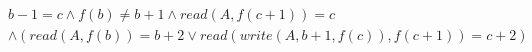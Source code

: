 \begin{align*}
%
& %
b - 1 = c
%
\land
%
f(b)  \neq  b + 1
%
\land
%
\mathit{read}(A,f(c + 1)) = c
~\\~
& %
%
\land
%
(\mathit{read}(A,f(b)) = b + 2 \lor \mathit{read}(\mathit{write}(A,b + 1,f(c)),f(c + 1)) = c + 2)
%
\end{align*}
